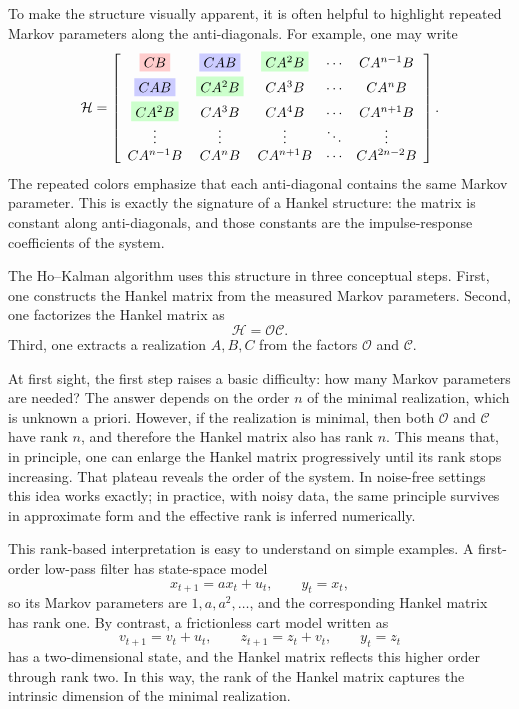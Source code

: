 To make the structure visually apparent, it is often helpful to highlight repeated Markov parameters along the anti-diagonals. For example, one may write
\[
\mathcal{H}=
\left[
\begin{array}{ccccc}
\colorbox{red!20}{$CB$} &
\colorbox{blue!20}{$CAB$} &
\colorbox{green!20}{$CA^2B$} &
\cdots &
CA^{n-1}B\\[0.3em]
\colorbox{blue!20}{$CAB$} &
\colorbox{green!20}{$CA^2B$} &
CA^3B &
\cdots &
CA^nB\\[0.3em]
\colorbox{green!20}{$CA^2B$} &
CA^3B &
CA^4B &
\cdots &
CA^{n+1}B\\
\vdots & \vdots & \vdots & \ddots & \vdots\\
CA^{n-1}B & CA^nB & CA^{n+1}B & \cdots & CA^{2n-2}B
\end{array}
\right].
\]
The repeated colors emphasize that each anti-diagonal contains the same Markov parameter. This is exactly the signature of a Hankel structure: the matrix is constant along anti-diagonals, and those constants are the impulse-response coefficients of the system.

The Ho--Kalman algorithm uses this structure in three conceptual steps. First, one constructs the Hankel matrix from the measured Markov parameters. Second, one factorizes the Hankel matrix as
\[
\mathcal{H}=\mathcal{O}\mathcal{C}.
\]
Third, one extracts a realization \(A,B,C\) from the factors \(\mathcal{O}\) and \(\mathcal{C}\).

At first sight, the first step raises a basic difficulty: how many Markov parameters are needed? The answer depends on the order \(n\) of the minimal realization, which is unknown a priori. However, if the realization is minimal, then both \(\mathcal{O}\) and \(\mathcal{C}\) have rank \(n\), and therefore the Hankel matrix also has rank \(n\). This means that, in principle, one can enlarge the Hankel matrix progressively until its rank stops increasing. That plateau reveals the order of the system. In noise-free settings this idea works exactly; in practice, with noisy data, the same principle survives in approximate form and the effective rank is inferred numerically.

This rank-based interpretation is easy to understand on simple examples. A first-order low-pass filter has state-space model
\[
x_{t+1}=ax_t+u_t,\qquad y_t=x_t,
\]
so its Markov parameters are \(1,a,a^2,\dots\), and the corresponding Hankel matrix has rank one. By contrast, a frictionless cart model written as
\[
v_{t+1}=v_t+u_t,\qquad z_{t+1}=z_t+v_t,\qquad y_t=z_t
\]
has a two-dimensional state, and the Hankel matrix reflects this higher order through rank two. In this way, the rank of the Hankel matrix captures the intrinsic dimension of the minimal realization.

